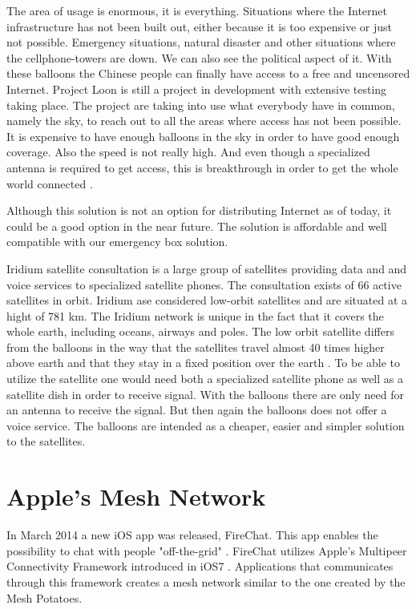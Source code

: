 The area of usage is enormous, it is everything. Situations where the Internet infrastructure has not been built out, either because it is too expensive or just not possible. Emergency situations, natural disaster and other situations where the cellphone-towers are down. We can also see the political aspect of it. With these balloons the Chinese people can finally have access to a free and uncensored Internet. Project Loon is still a project in development with extensive testing taking place. The project are taking into use what everybody have in common, namely the sky, to reach out to all the areas where access has not been possible. It is expensive to have enough balloons in the sky in order to have good enough coverage. Also the speed is not really high. And even though a specialized antenna is required to get access, this is breakthrough in order to get the whole world connected \cite{loonYouTube, loonNorsk}.

Although this solution is not an option for distributing Internet as of today, it could be a good option in the near future. The solution is affordable and well compatible with our emergency box solution.

Iridium satellite consultation is a large group of satellites providing data and and voice services to specialized satellite phones. The consultation exists of 66 active satellites in orbit. Iridium ase considered low-orbit satellites and are situated at a hight of 781 km. The Iridium network is unique in the fact that it covers the whole earth, including oceans, airways and poles. The low orbit satellite differs from the balloons in the way that the satellites travel almost 40 times higher above earth and that they stay in a fixed position over the earth \cite{iridium}. To be able to utilize the satellite one would need both a specialized satellite phone as well as a satellite dish in order to receive signal. With the balloons there are only need for an antenna to receive the signal. But then again the balloons does not offer a voice service. The balloons are intended as a cheaper, easier and simpler solution to the satellites.                                         

\section{Apple's Mesh Network}
In March 2014 a new iOS app was released, FireChat. This app enables the possibility to chat with people "off-the-grid" \cite{fireChat}. FireChat utilizes Apple's Multipeer Connectivity Framework introduced in iOS7 \cite{appleMesh}. Applications that communicates through this framework creates a mesh network similar to the one created by the Mesh Potatoes. 

